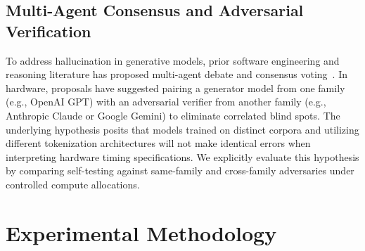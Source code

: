 \documentclass[conference]{IEEEtran}
\begin{document}
\subsection{Multi-Agent Consensus and Adversarial Verification}
To address hallucination in generative models, prior software engineering and reasoning literature has proposed multi-agent debate and consensus voting~\cite{du2023debate}. In hardware, proposals have suggested pairing a generator model from one family (e.g., OpenAI GPT) with an adversarial verifier from another family (e.g., Anthropic Claude or Google Gemini) to eliminate correlated blind spots. The underlying hypothesis posits that models trained on distinct corpora and utilizing different tokenization architectures will not make identical errors when interpreting hardware timing specifications. We explicitly evaluate this hypothesis by comparing self-testing against same-family and cross-family adversaries under controlled compute allocations.

\section{Experimental Methodology}
\end{document}
